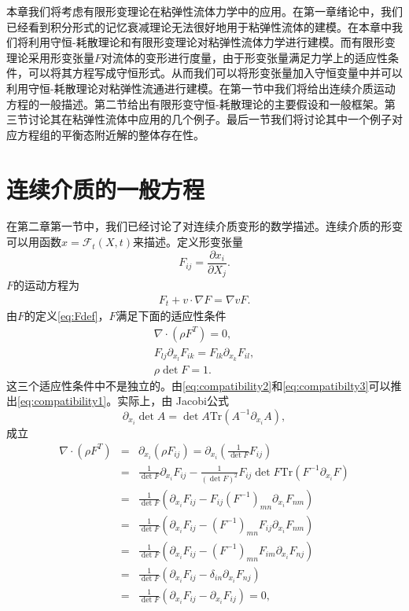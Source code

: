 \documentclass{article}
\begin{document}
本章我们将考虑有限形变理论在粘弹性流体力学中的应用。在第一章绪论中，我们已经看到积分形式的记忆衰减理论无法很好地用于粘弹性流体的建模。在本章中我们将利用守恒-耗散理论和有限形变理论对粘弹性流体力学进行建模。而有限形变理论采用形变张量$F$对流体的变形进行度量，由于形变张量满足力学上的适应性条件，可以将其方程写成守恒形式。从而我们可以将形变张量加入守恒变量中并可以利用守恒-耗散理论对粘弹性流通进行建模。在第一节中我们将给出连续介质运动方程的一般描述。第二节给出有限形变守恒-耗散理论的主要假设和一般框架。第三节讨论其在粘弹性流体中应用的几个例子。最后一节我们将讨论其中一个例子对应方程组的平衡态附近解的整体存在性。

\section{连续介质的一般方程}
在第二章第一节中，我们已经讨论了对连续介质变形的数学描述。连续介质的形变可以用函数$x=\mathcal{F}_t (X,t)$来描述。定义形变张量
\begin{equation*}\label{eq:Fdef}
	F_{ij} = \frac{\partial x_i}{\partial X_j}.
\end{equation*}
$F$的运动方程为
\begin{eqnarray}\label{eq:Feq}
F_t + v \cdot \nabla F = \nabla v F.
\end{eqnarray}
由$F$的定义\eqref{eq:Fdef}，$F$满足下面的适应性条件
\begin{subequations}
\begin{align}
\nabla \cdot (\rho F^T) = 0,\label{eq:compatibility1} \\
 F_{lj} \partial_{x_l} F_{ik} = F_{lk} \partial_{x_k} F_{il} , \label{eq:compatibility2} \\
 \rho \det F = 1. \label{eq:compatibilty3} 
\end{align}
\end{subequations}
这三个适应性条件中不是独立的。由\eqref{eq:compatibility2}和\eqref{eq:compatibilty3}可以推出\eqref{eq:compatibility1}。实际上，由
Jacobi公式
$$
\partial_{x_i}\det A = \det A \mbox{Tr}(A^{-1} \partial_{x_i} A),
$$
成立
\begin{eqnarray*}
\nabla \cdot (\rho F^T)  & = &\partial_{x_i} ( \rho F_{ij}) = \partial_{x_i} ( \frac{1}{\det F} F_{ij})  \\
&=& \frac{1}{\det F} \partial_{x_i} F_{ij}  - \frac{1}{(\det F)^2} F_{ij} \det F \mbox{Tr}(F^{-1} \partial_{x_i} F) \\
&=&\frac{1}{\det F} (\partial_{x_i} F_{ij} - F_{ij} (F^{-1})_{mn} \partial_{x_i} F_{nm}) \\
&=& \frac{1}{\det F} (\partial_{x_i} F_{ij} - (F^{-1})_{mn} F_{ij} \partial_{x_i} F_{nm}) \\
&=&  \frac{1}{\det F} (\partial_{x_i} F_{ij} - (F^{-1})_{mn} F_{im} \partial_{x_i} F_{nj}) \\
&=&  \frac{1}{\det F} (\partial_{x_i} F_{ij} - \delta_{in} \partial_{x_i} F_{nj}) \\
&=&  \frac{1}{\det F} (\partial_{x_i} F_{ij} - \partial_{x_i} F_{ij}) =0 ,
\end{eqnarray*}
\end{document}
